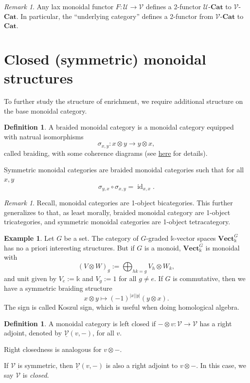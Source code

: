 \documentclass[11pt]{article}
\theoremstyle{definition}
\newtheorem{definition}[theorem]{Definition}
\newtheorem{example}[theorem]{Example}
\theoremstyle{remark}
\newtheorem{remark}[theorem]{Remark}
\newcommand{\id}{\operatorname{id}}
\newcommand{\calU}{\mathcal{U}}
\newcommand{\calV}{\mathcal{V}}
\newcommand{\ucalV}{\underline{\mathcal{V}}}
\begin{document}
\begin{remark}
    Any lax monoidal functor $F : \calU \to \calV$ defines a 2-functor $\calU$-$\textbf{Cat}$ to $\calV$-$\textbf{Cat}$.
    In particular, the ``underlying category'' defines a 2-functor from $\calV$-$\textbf{Cat}$ to $\textbf{Cat}$.
\end{remark}

\section{Closed (symmetric) monoidal structures}

To further study the structure of enrichment, we require additional structure on the base monoidal category.

\begin{definition}
    A braided monoidal category is a monoidal category equipped with natrual isomorphisms
    $$\sigma_{x,y} : x \otimes y \to y \otimes x,$$
    called braiding, with some coherence diagrams
    (see \href{https://ncatlab.org/nlab/show/braided+monoidal+category}{here} for details).

    Symmetric monoidal categories are braided monoidal categories such that for all $x,y$
    $$\sigma_{y,x} \circ \sigma_{x,y} = \id_{x,x}.$$

\end{definition}

\begin{remark}
    Recall, monoidal categories are 1-object bicategories.
    This further generalizes to that, as least morally, braided monoidal category are 1-object tricategories,
    and symmetric monoidal categories are 1-object tetracategory.
\end{remark}

\begin{example}
    Let $G$ be a set. The category of $G$-graded $\mathbb k$-vector spaces $\mathbf{Vect}^G_{\mathbb k}$ has no a priori interesting structures.
    But if $G$ is a monoid, $\mathbf{Vect}^G_{\mathbb k}$ is monoidal with
    $$(V \otimes W)_g := \bigoplus_{hk=g} V_h \otimes W_k,$$
    and unit given by $V_e := \mathbb k$ and $V_g := 1$ for all $g \ne e$.
    If $G$ is commutative, then we have a symmetric braiding structure
    $$x \otimes y \mapsto (-1)^{|x||y|}(y\otimes x).$$
    The sign is called Koszul sign, which is useful when doing homological algebra.
\end{example}

\begin{definition}
    A monoidal category is left closed if $-\otimes v : \calV \to \calV$ has a right adjoint,
    denoted by $\ucalV(v,-)$, for all $v$.

    Right closedness is analogous for $v \otimes -$.

    If $\calV$ is symmetric, then $\ucalV(v,-)$ is also a right adjoint to $v\otimes -$.
    In this case, we say $\calV$ is \emph{closed}.
\end{definition}
\end{document}
